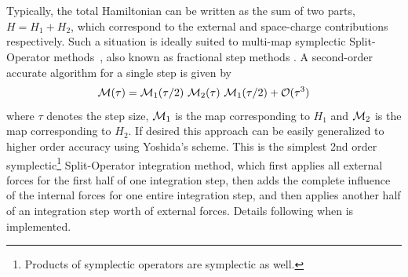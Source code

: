 \section{\opalmap} \label{sec:SplitOperatorMethods}

Typically, the total Hamiltonian can be written as the sum of two parts, $H = H_{1} + H_{2}$,
which correspond to the external and space-charge contributions respectively.
Such a situation is ideally suited to multi-map
symplectic Split-Operator methods~\cite{forestall}, also known as fractional step methods \cite{SanzSerna}.
A second-order accurate algorithm for a single step is given by
\begin{equation} \label{eq:splitOper1}
{\cal M}(\tau)={\cal M}_1(\tau/2)~{\cal M}_2(\tau)~{\cal M}_1(\tau/2) + \mathcal{O}(\tau^3)
\end{equation}
where $\tau$ denotes the step size, ${\cal M}_1$ is the map corresponding
to $H_{1}$  and ${\cal M}_2$ is the map corresponding to $H_{2}$.
If desired this approach can be
easily generalized to higher order accuracy using Yoshida's
scheme. %
This is the simplest 2nd order symplectic\footnote{Products of symplectic operators are symplectic as well.} Split-Operator integration method, which first applies all external forces for the first half of one integration step, then adds the complete influence of the internal forces for one entire integration step, and then applies another half of an integration step worth of external forces.
Details following when \opalmap is implemented.










